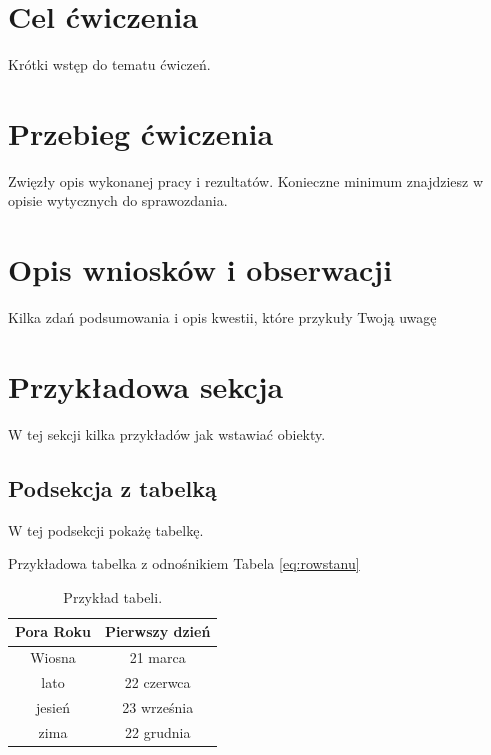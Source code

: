 \documentclass{sprawozdanie-agh}
\begin{document}

\stronatytulowa{}


\section{Cel ćwiczenia}
Krótki wstęp do tematu ćwiczeń.
\section{Przebieg ćwiczenia}
Zwięzły opis wykonanej pracy i rezultatów.
Konieczne minimum znajdziesz w opisie wytycznych do sprawozdania.
\section{Opis wniosków i obserwacji}
Kilka zdań podsumowania i opis kwestii, które przykuły Twoją uwagę

\newpage

\section{Przykładowa sekcja}
W tej sekcji kilka przykładów jak wstawiać obiekty.
\subsection{Podsekcja z tabelką}

    W tej podsekcji pokażę tabelkę.
    
    Przykładowa tabelka z odnośnikiem Tabela \ref{eq:rowstanu}
    
    \begin{table}[h!]
        \centering
        \caption{Przykład tabeli.}\label{tab1}
        \begin{tabular}{|c|c|}
            \hline
            Pora Roku &  Pierwszy dzień\\
            \hline
            Wiosna &  21 marca \\
            lato &  22 czerwca\\
            jesień & 23 września \\
            zima & 22 grudnia\\
            \hline
        \end{tabular}
    \end{table}
\end{document}
